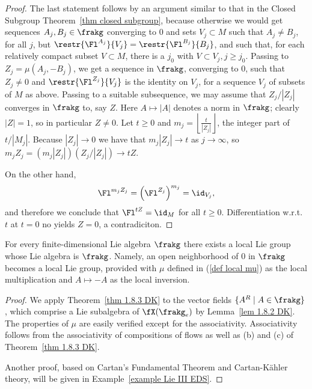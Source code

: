 \begin{proof}
    The last statement follows by an argument similar to that in the Closed Subgroup Theorem~\ref{thm closed subgroup}, because otherwise we would get sequences $A_j,B_j\in\frakg$ converging to $0$ and sets $V_j\subset M$ such that $A_j\neq B_j$, for all $j$, but $\restr{\Fl^{A_j}}{V_j}=\restr{\Fl^{B_j}}{B_j}$, and such that, for each relatively compact subset $V\subset M$, there is a $j_0$ with $V\subset V_j,j\geq j_0$. Passing to $Z_j=\mu(A_j,-B_j)$, we get a sequence in $\frakg$, converging to $0$, such that $Z_j\neq 0$ and $\restr{\Fl^{Z_j}}{V_j}$ is the identity on $V_j$, for a sequence $V_j$ of subsets of $M$ as above. Passing to a suitable subsequence, we may assume that $Z_j/|Z_j|$ converges in $\frakg$ to, say $Z$. Here $A\mapsto |A|$ denotes a norm in $\frakg$; clearly $|Z|=1$, so in particular $Z\neq 0$. Let $t\geq 0$ and $m_j=\left\lfloor\frac{t}{|Z_j|}\right\rfloor$, the integer part of $t/|M_j|$. Because $|Z_j|\to 0$ we have that $m_j|Z_j|\to t$ as $j\to \infty$, so $m_j Z_j=(m_j|Z_j|)(Z_j/|Z_j|)\to tZ$.

    On the other hand,
    \[\Fl^{m_jZ_j}=\left(\Fl^{Z_j}\right)^{m_j}=\id_{V_j},\]
    and therefore we conclude that $\Fl^{tZ}=\id_{M}$ for all $t\geq 0$. Differentiation w.r.t.\ $t$ at $t=0$ no yields $Z=0$, a contradiciton.
\end{proof}


\begin{thm}\label{thm local Lie's third}
    For every finite-dimensional Lie algebra $\frakg$ there exists a local Lie group whose Lie algebra is $\frakg$. Namely, an open neighborhood of $0$ in $\frakg$ becomes a local Lie group, provided with $\mu$ defined in (\ref{def local mu}) as the local multiplication and $A\mapsto -A$ as the local inversion.
\end{thm}
\begin{proof}
    We apply Theorem~\ref{thm 1.8.3 DK} to the vector fields $\{A^R\mid A\in\frakg\}$, which comprise a Lie subalgebra of $\fX(\frakg_e)$ by Lemma~\ref{lem 1.8.2 DK}. The properties of $\mu$ are easily verified except for the associativity. Associativity follows from the associativity of compositions of flows as well as (b) and (c) of Theorem~\ref{thm 1.8.3 DK}.

    Another proof, based on Cartan's Fundamental Theorem and Cartan-K\"ahler theory, will be given in Example~\ref{example Lie III EDS}. 
\end{proof}

